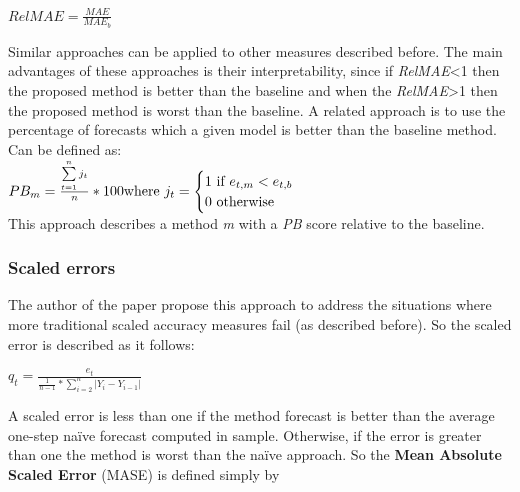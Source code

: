 \begin{center}
\Large
\begin{math}
  RelMAE = \frac{MAE}{MAE_b}
\end{math}
\normalsize
\end{center}

Similar approaches can be applied to other measures described before.
The main advantages of these approaches is their interpretability, since if
\emph{RelMAE}<1 then the proposed method is better than the baseline and when
the \emph{RelMAE}>1 then the proposed method is worst than the baseline.
A related approach is to use the percentage of forecasts which a given model is better than
the baseline method.\cite{Armstrong199269} Can be defined as:
\\

\Large
\begin{math}
 PB_m=\frac{\sum\limits_{t=1}^n j_t}{n}*100\\ \text{where }j_t =
 \begin{cases}\text{1 if }e_{t,m} < e_{t,b}\\ \text{0 otherwise }\end{cases}
\end{math}
\normalsize
\\

This approach describes a method \emph{m} with a \emph{PB} score relative to the
baseline.

\subsubsection{Scaled errors}

The author of the paper \cite{Hyndman2006679} propose this approach to address
the situations where more traditional scaled accuracy measures fail (as
described before). So the scaled error is described as it follows:

\begin{center}
\Large
\begin{math}
  q_t = \frac{e_t}{\frac{1}{n-1}*\sum\limits_{i=2}^n\left|Y_i - Y_{i-1}\right|}
\end{math}
\normalsize
\end{center}

A scaled error is less than one if the method forecast is better than the
average one-step na\"{i}ve forecast computed in sample. Otherwise, if the error
is greater than one the method is worst than the na\"{i}ve approach.
So the \textbf{Mean Absolute Scaled Error} (MASE) is defined simply by

